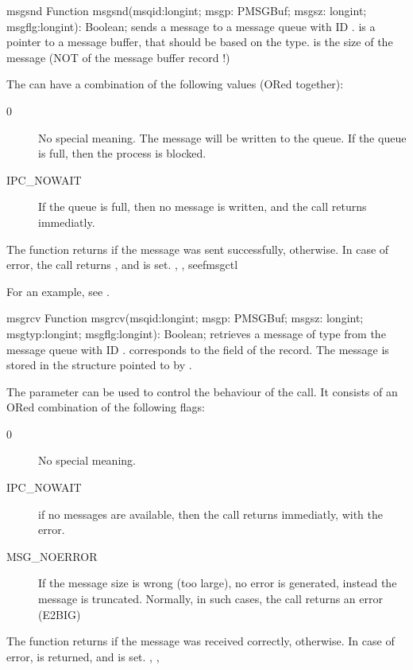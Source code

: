 \begin{function}{msgsnd}
\Declaration
Function msgsnd(msqid:longint; msgp: PMSGBuf; msgsz: longint; msgflg:longint): Boolean;
\Description
{} sends a message to a message queue with ID .
 is a pointer to a message buffer, that should be based on the
 type.  is the size of the message (NOT of the
message buffer record !)

The  can have a combination of the following values (ORed
together):
\begin{description}
\item [0] No special meaning. The message will be written to the queue.
If the queue is full, then the process is blocked.
\item [IPC\_NOWAIT] If the queue is full, then no message is written,
and the call returns immediatly.
\end{description}

The function returns  if the message was sent successfully, 
 otherwise.
\Errors
In case of error, the call returns , and  is set.
\SeeAlso
{}, , seef{msgctl}
\end{function}

For an example, see .

\begin{function}{msgrcv}
\Declaration
Function msgrcv(msqid:longint; msgp: PMSGBuf; msgsz: longint; msgtyp:longint; msgflg:longint): Boolean;
\Description
{} retrieves a message of type  from the message 
queue with ID .  corresponds to the  
field of the  record. The message is stored in the 
structure pointed to by .

The  parameter can be used to control the behaviour of the
 call. It consists of an ORed combination of the following
flags:
\begin{description}
\item [0] No special meaning.
\item [IPC\_NOWAIT] if no messages are available, then the call returns
immediatly, with the  error.
\item [MSG\_NOERROR] If the message size is wrong (too large), 
no error is generated, instead the message is truncated. 
Normally, in such cases, the call returns an error (E2BIG)
\end{description}

The function returns  if the message was received correctly,
 otherwise.
\Errors
In case of error,  is returned, and  is set.
\SeeAlso
{}, , 
\end{function}

